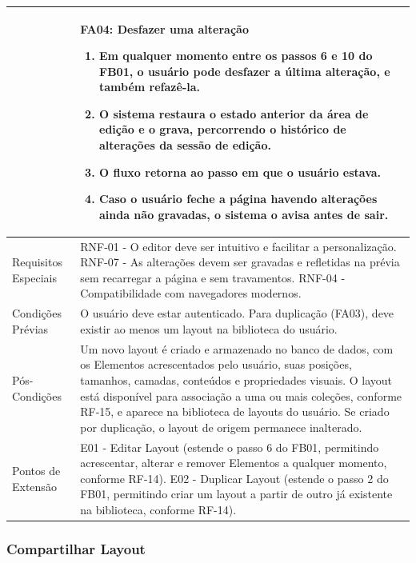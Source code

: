 \begin{longtable}{ >{\raggedright}p{2.8cm} | >{\raggedright\arraybackslash}p{10.7cm} }
 & \mbox{}
\textbf{FA04:} Desfazer uma alteração
\vspace{2pt}
\begin{enumerate}[nosep,leftmargin=1.2em,topsep=0pt,partopsep=0pt,parsep=0pt,itemsep=0pt,after=\vspace{2pt}]
	\item Em qualquer momento entre os passos 6 e 10 do FB01, o usuário pode desfazer a última alteração, e também refazê-la.
	\item O sistema restaura o estado anterior da área de edição e o grava, percorrendo o histórico de alterações da sessão de edição.
	\item O fluxo retorna ao passo em que o usuário estava.
	\item Caso o usuário feche a página havendo alterações ainda não gravadas, o sistema o avisa antes de sair.
\end{enumerate}
\mbox{} \\ \hline

Requisitos Especiais & RNF-01 - O editor deve ser intuitivo e facilitar a personalização. RNF-07 - As alterações devem ser gravadas e refletidas na prévia sem recarregar a página e sem travamentos. RNF-04 - Compatibilidade com navegadores modernos. \\ \hline

Condições Prévias & O usuário deve estar autenticado. Para duplicação (FA03), deve existir ao menos um layout na biblioteca do usuário. \\ \hline

Pós-Condições & Um novo layout é criado e armazenado no banco de dados, com os Elementos acrescentados pelo usuário, suas posições, tamanhos, camadas, conteúdos e propriedades visuais. O layout está disponível para associação a uma ou mais coleções, conforme RF-15, e aparece na biblioteca de layouts do usuário. Se criado por duplicação, o layout de origem permanece inalterado. \\ \hline

Pontos de Extensão & E01 - Editar Layout (estende o passo 6 do FB01, permitindo acrescentar, alterar e remover Elementos a qualquer momento, conforme RF-14). E02 - Duplicar Layout (estende o passo 2 do FB01, permitindo criar um layout a partir de outro já existente na biblioteca, conforme RF-14). \\
\end{longtable}
\renewcommand{\arraystretch}{1}
\FloatBarrier


\subsubsection{Compartilhar Layout}

